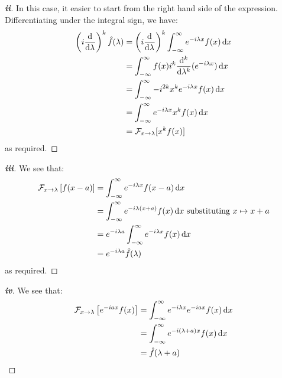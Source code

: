 \documentclass[../main.tex]{subfiles}
\begin{document}
\begin{proof}[\textbf{ii}]
  In this case, it easier to start from the right hand side of the expression.
  Differentiating under the integral sign, we have:
  \begin{align*}
    \left(i \deriv{}{\lambda}\right)^{k} \hat{f}(\lambda) &= \left(i \deriv{}{\lambda}\right)^{k} \int_{-\infty}^{\infty} e^{-i \lambda x}f(x) \d{x} \\
                                                          &= \int_{-\infty}^{\infty} f(x) i^k \deriv[k]{}{\lambda}(e^{-i\lambda x}) \d{x}\\
                                                          &= \int_{-\infty}^{\infty} -i^{2k} x^k e^{-i \lambda x} f(x) \d{x} \\
                                                          &= \int_{-\infty}^{\infty} e^{-i\lambda x} x^{k} f(x) \d{x} \\
                                                          &= \mathcal{F}_{x \to \lambda}[x^{k} f(x)]
  \end{align*}
  as required.
\end{proof}
\begin{proof}[\textbf{iii}]
  We see that:
  \begin{align*}
    \mathcal{F}_{x \to \lambda}\left[f(x - a)\right] &= \int_{-\infty}^{\infty} e^{-i\lambda x} f(x - a) \d{x} \\
                                                     &= \int_{-\infty}^{\infty} e^{-i \lambda (x + a)} f(x) \d{x} \text{ substituting $x \mapsto x + a$} \\
                                                     &= e^{-i \lambda a} \int_{-\infty}^{\infty} e^{-i\lambda x} f(x) \d{x} \\
                                                     &= e^{-i \lambda a} \hat{f}(\lambda)
  \end{align*}
  as required.
\end{proof}
\begin{proof}[\textbf{iv}]
  We see that:
  \begin{align*}
    \mathcal{F}_{x \to \lambda}\left[e^{-iax}f(x)\right] &= \int_{-\infty}^{\infty} e^{-i\lambda x} e^{-iax} f(x) \d{x} \\
                                                         &= \int_{-\infty}^{\infty} e^{-i(\lambda + a)x} f(x) \d{x} \\
                                                         &= \hat{f}(\lambda + a)
  \end{align*}
\end{proof}
\end{document}
